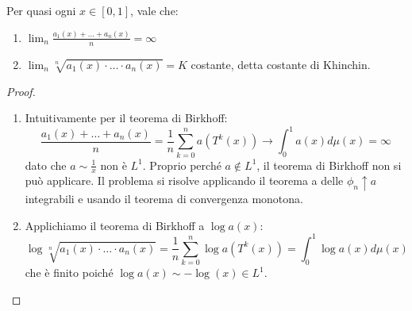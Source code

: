 \begin{prop} Per quasi ogni $x\in [0,1]$, vale che: \begin{enumerate}
\item $\displaystyle\lim_n \frac{a_1(x)+\dots+a_n(x)}{n}=\infty$
\item $\displaystyle\lim_n \sqrt[n]{a_1(x)\cdot\dots\cdot a_n(x)}=K$ costante, detta costante di Khinchin.
\end{enumerate}
\end{prop}

\begin{proof}\leavevmode\begin{enumerate}
\item Intuitivamente per il teorema di Birkhoff:
$$\frac{a_1(x)+\dots+a_n(x)}{n}=\frac{1}{n}\sum_{k=0}^n a(T^k(x))\longrightarrow \int_0^1 a(x) d\mu(x)=\infty$$
dato che $a\sim \frac{1}{x}$ non \`e $L^1$. Proprio perch\'e $a\not\in L^1$, il teorema di Birkhoff non si pu\`o applicare. Il problema si risolve applicando il teorema a delle $\phi_n\uparrow a$ integrabili e usando il teorema di convergenza monotona.
\item Applichiamo il teorema di Birkhoff a $\log a(x)$:
$$\log \sqrt[n]{a_1(x)\cdot\dots\cdot a_n(x)}=\frac{1}{n}\sum_{k=0}^n \log a(T^k(x))=\int_0^1 \log a(x) d\mu(x)$$
che \`e finito poich\'e $\log a(x) \sim -\log(x)\in L^1$.

\end{enumerate}
\end{proof}
